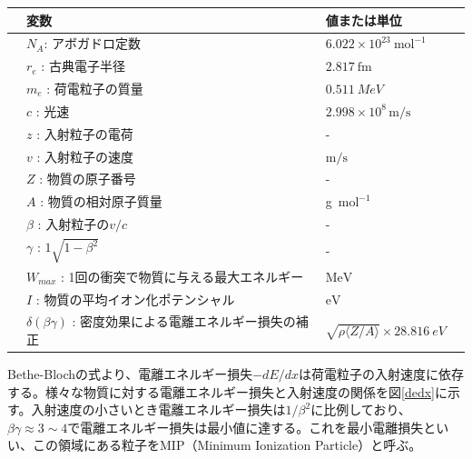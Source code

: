\begin{table}[H]
 \label{table:bethe}
 \centering
  \begin{tabular}{clll}
   \hline \hline
   &変数 & 値または単位 \\
   \hline
&$N_A $: アボガドロ定数 & $6.022 \times 10^{23}\: {\si{\mol}}^{-1}$\\
&$r_e$ : 古典電子半径&$2.817\: \mathrm{fm}$\\ 
&$m_e$ : 荷電粒子の質量 &$\SI{0.511}{MeV}$\\
&$c$ : 光速 & $2.998 \times 10^8 \, \mathrm{m/s}$\\
&$z$ : 入射粒子の電荷& - \\
&$v$ : 入射粒子の速度& $\mathrm{m/s}$\\
&$Z$ : 物質の原子番号 & - \\
&$A$ : 物質の相対原子質量 & g\ ${\si{\mol}}^{-1}$ \\
&$\beta$ : 入射粒子の$v/c$ & - \\
&$\gamma$ : $1\sqrt{1-{\beta}^2}$ & - \\
&$W_{max}$ : 1回の衝突で物質に与える最大エネルギー & $\mathrm{MeV}$\\
&$I$ : 物質の平均イオン化ポテンシャル &$\mathrm{eV}$\\
&$\delta(\beta \gamma)$ : 密度効果による電離エネルギー損失の補正 & $\sqrt{\rho \langle Z/A\rangle } \times \SI{28.816}{eV}$\\
 \hline
  \end{tabular}
\end{table}
Bethe-Blochの式より、電離エネルギー損失$-dE/dx$は荷電粒子の入射速度に依存する。様々な物質に対する電離エネルギー損失と入射速度の関係を図\ref{dedx}に示す。入射速度の小さいとき電離エネルギー損失は$1/{\beta}^2$に比例しており、$\beta \gamma  \approx 3 \sim 4$で電離エネルギー損失は最小値に達する。これを最小電離損失といい、この領域にある粒子をMIP（Minimum Ionization Particle）と呼ぶ。

\clearpage

